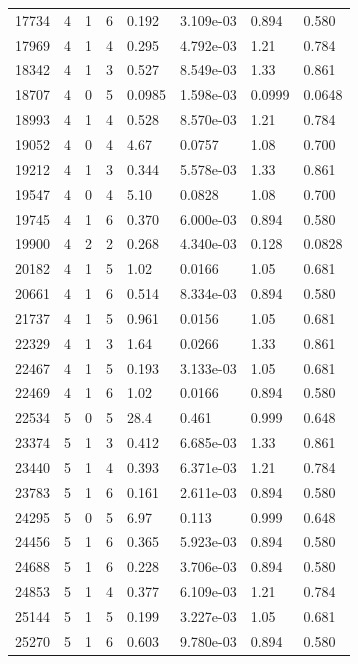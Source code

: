\documentclass[preview]{standalone}
\begin{document}
{{{\begin{tabular}{L{1.2cm}C{1.2cm} C{0.3cm}C{0.5cm} C{1.4cm}C{1.4cm} C{1.4cm}C{1.4cm}}
  17734  &     4  & 1     &  6 &  0.192  & 3.109e-03  & 0.894 &  0.580   \\ 
  17969  &     4  & 1     &  4 &  0.295  & 4.792e-03  & 1.21 &  0.784   \\ 
  18342  &     4  & 1     &  3 &  0.527  & 8.549e-03  & 1.33 &  0.861   \\ 
  18707  &     4  & 0     &  5 &  0.0985  & 1.598e-03  & 0.0999 &  0.0648   \\ 
  18993  &     4  & 1     &  4 &  0.528  & 8.570e-03  & 1.21 &  0.784   \\ 
  19052  &     4  & 0     &  4 &  4.67  & 0.0757  & 1.08 &  0.700   \\ 
  19212  &     4  & 1     &  3 &  0.344  & 5.578e-03  & 1.33 &  0.861   \\ 
  19547  &     4  & 0     &  4 &  5.10  & 0.0828  & 1.08 &  0.700   \\ 
  19745  &     4  & 1     &  6 &  0.370  & 6.000e-03  & 0.894 &  0.580   \\ 
  19900  &     4  & 2     &  2 &  0.268  & 4.340e-03  & 0.128 &  0.0828   \\ 
  20182  &     4  & 1     &  5 &  1.02  & 0.0166  & 1.05 &  0.681   \\ 
  20661  &     4  & 1     &  6 &  0.514  & 8.334e-03  & 0.894 &  0.580   \\ 
  21737  &     4  & 1     &  5 &  0.961  & 0.0156  & 1.05 &  0.681   \\ 
  22329  &     4  & 1     &  3 &  1.64  & 0.0266  & 1.33 &  0.861   \\ 
  22467  &     4  & 1     &  5 &  0.193  & 3.133e-03  & 1.05 &  0.681   \\ 
  22469  &     4  & 1     &  6 &  1.02  & 0.0166  & 0.894 &  0.580   \\ 
  22534  &     5  & 0     &  5 &  28.4  & 0.461  & 0.999 &  0.648   \\ 
  23374  &     5  & 1     &  3 &  0.412  & 6.685e-03  & 1.33 &  0.861   \\ 
  23440  &     5  & 1     &  4 &  0.393  & 6.371e-03  & 1.21 &  0.784   \\ 
  23783  &     5  & 1     &  6 &  0.161  & 2.611e-03  & 0.894 &  0.580   \\ 
  24295  &     5  & 0     &  5 &  6.97  & 0.113  & 0.999 &  0.648   \\ 
  24456  &     5  & 1     &  6 &  0.365  & 5.923e-03  & 0.894 &  0.580   \\ 
  24688  &     5  & 1     &  6 &  0.228  & 3.706e-03  & 0.894 &  0.580   \\ 
  24853  &     5  & 1     &  4 &  0.377  & 6.109e-03  & 1.21 &  0.784   \\ 
  25144  &     5  & 1     &  5 &  0.199  & 3.227e-03  & 1.05 &  0.681   \\ 
  25270  &     5  & 1     &  6 &  0.603  & 9.780e-03  & 0.894 &  0.580   \\ 
\hline 
\end{tabular} 

}}}
\end{document}
